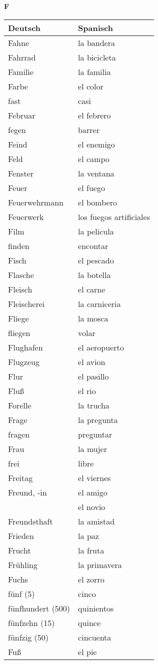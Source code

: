 \begin{flushright}\begin{Huge}\textbf{F}\end{Huge}\end{flushright}

\begin{longtable}{p{} p{}} 
\textbf{Deutsch}     & \textbf{Spanisch}                                       \\ \hline
\hline
\endhead %
Fahne & la bandera\\
Fahrrad & la bicicleta\\
Familie & la familia\\
Farbe & el color\\
fast & casi \\
Februar & el febrero\\
fegen & barrer\\
Feind & el enemigo\\
Feld & el campo\\
Fenster & la ventana\\
Feuer & el fuego\\
Feuerwehrmann & el bombero\\
Feuerwerk & los fuegos artificiales\\
Film & la pelicula\\
finden & encontar\\
Fisch & el pescado\\
Flasche & la botella\\
Fleisch & el carne \\
Fleischerei & la carniceria\\
Fliege & la mosca\\
fliegen & volar\\
Flughafen & el aeropuerto\\
Flugzeug & el avion\\
Flur & el pasillo\\
Fluß & el rio\\
Forelle & la trucha \\
Frage & la pregunta\\
fragen & preguntar\\
Frau & la mujer \\
frei & libre\\
Freitag & el viernes\\
Freund, -in & el amigo\\
~ & el novio\\
Freundsthaft & la amistad\\
Frieden & la paz\\
Frucht & la fruta\\
Frühling & la primavera\\
Fuchs & el zorro\\
fünf (5) & cinco \\
fünfhundert (500) & quinientos\\
fünfzehn (15) & quince\\
fünfzig (50) & cincuenta\\
Fuß & el pie\\
\end{longtable}
